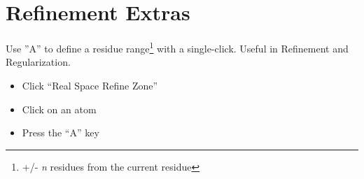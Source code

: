 \documentclass[twocolumn]{article}
\begin{document}
\section{Refinement Extras}
Use ''A'' to define a residue range\footnote{+/- \emph{n} residues
  from the current residue} with a single-click. Useful in Refinement
and Regularization.

\begin{itemize}
\item Click ``Real Space Refine Zone''
\item Click on an atom
\item Press the ``A'' key
\end{itemize}
\end{document}
